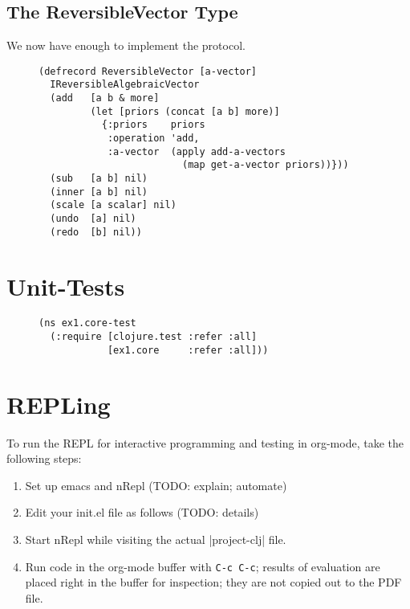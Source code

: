\documentclass[11pt]{article}
\begin{document}
\subsection{The ReversibleVector Type}
\label{sec-4-6}

We now have enough to implement the protocol.

\begin{figure}[H]
\label{reversible-algebraic-vector-on-vector}
\begin{verbatim}
(defrecord ReversibleVector [a-vector]
  IReversibleAlgebraicVector
  (add   [a b & more]
         (let [priors (concat [a b] more)]
           {:priors    priors
            :operation 'add,
            :a-vector  (apply add-a-vectors
                         (map get-a-vector priors))}))
  (sub   [a b] nil)
  (inner [a b] nil)
  (scale [a scalar] nil)
  (undo  [a] nil)
  (redo  [b] nil))
\end{verbatim}
\end{figure}
\section{Unit-Tests}
\label{sec-5}

\begin{figure}[H]
\label{test-namespace}
\begin{verbatim}
(ns ex1.core-test
  (:require [clojure.test :refer :all]
            [ex1.core     :refer :all]))
\end{verbatim}
\end{figure}
\section{REPLing}
\label{sec-6}
\label{sec:emacs-repl}
To run the REPL for interactive programming and testing in org-mode,
take the following steps:
\begin{enumerate}
\item Set up emacs and nRepl (TODO: explain; automate)
\item Edit your init.el file as follows (TODO: details)
\item Start nRepl while visiting the actual |project-clj| file.
\item Run code in the org-mode buffer with \verb|C-c C-c|; results of
evaluation are placed right in the buffer for inspection; they are
not copied out to the PDF file.
\end{enumerate}
\end{document}
